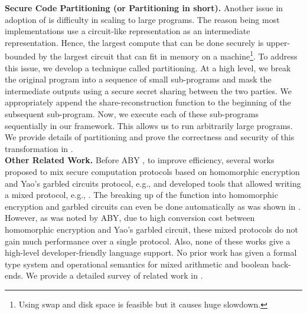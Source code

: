\noindent\textbf{Secure Code Partitioning (or Partitioning in short).} Another issue in adoption of \mpc is difficulty in scaling to large programs. 
The reason being most \mpc implementations use a circuit-like representation as an intermediate representation. Hence, the largest compute that can be done securely is upper-bounded by the largest circuit that can fit in memory on a machine\footnote{Using swap and disk space is feasible but it causes huge slowdown.}.
To address this issue, we develop a technique called partitioning.  At a high level, we break the original program into a sequence of small sub-programs and mask the intermediate outputs using a secure secret sharing between the two parties. We appropriately append the share-reconstruction function to the beginning of the subsequent sub-program. Now, we execute each of these sub-programs sequentially in our framework. This allows us to run arbitrarily large programs. We provide details of partitioning and prove the correctness and security of this transformation in . \\







\noindent\textbf{Other Related Work.} 
Before ABY \cite{aby}, to improve efficiency, several works proposed
to mix secure computation protocols based on homomorphic
encryption and Yao's garbled circuits protocol, e.g., \cite{barni,blanton,brickell,franz,huang,valeriaMatrix,valeriaRidge,schropferK11}
  and developed tools that allowed writing a mixed \mpc protocol, e.g., \cite{bogdanov,lone,tasty}. The breaking up of the function into homomorphic encryption and garbled circuits can
even be done automatically as was shown in \cite{autoS}. 
However, as was noted by ABY, due to high conversion cost between homomorphic encryption and Yao's garbled circuit, these mixed protocols do not gain much performance over a single protocol. Also, none of these works give a high-level developer-friendly language support.
No prior work has given a formal type system and operational semantics for mixed arithmetic and boolean back-ends.
We provide a detailed survey of related work in .




